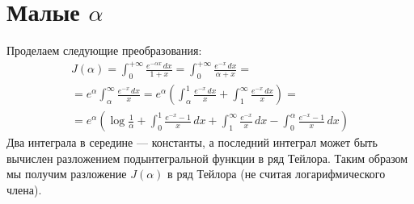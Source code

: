 \documentclass{article}
\begin{document}
\section{Малые $\alpha$}
Проделаем следующие преобразования:
\begin{multline}
	J(\alpha) = \int_{0}^{+\infty} \frac{e^{-\alpha x}\,dx}{1 + x} = 
	 	\int_{0}^{+\infty} \frac{e^{-x}\,dx}{\alpha + x} = \\
		=e^{\alpha} \int_{\alpha}^{\infty} \frac{e^{-x}\,dx}{x}  
		=e^{\alpha}\left( \int_{\alpha}^{1} \frac{e^{-x}\,dx}{x}+ 
			\int_{1}^{\infty} \frac{e^{-x}\,dx}{x} \right) = \\
		=e^{\alpha}\left( \log{\frac{1}{\alpha}} + \int_{0}^{1}\frac{e^{-x} - 1}{x}\,dx + 
			\int_{1}^{\infty} \frac{e^{-x}}{x}\,dx
			-\int_{0}^{\alpha} \frac{e^{-x} - 1}{x}\,dx \right)
\end{multline}
Два интеграла в середине --- константы, а последний интеграл может быть вычислен
разложением подынтегральной функции в ряд Тейлора. Таким образом мы получим
разложение $J(\alpha)$ в ряд Тейлора (не считая логарифмического члена).
\end{document}
